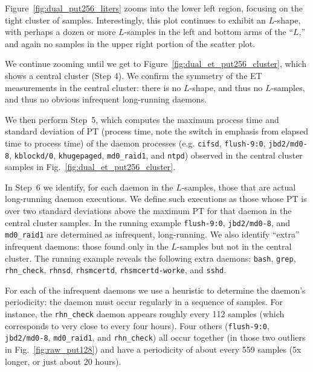\documentclass[letter]{ieice}
\begin{document}
Figure~\ref{fig:dual_put256_liters} zooms into the lower left region,
focusing on the
tight cluster of samples.  Interestingly, this plot continues to exhibit an
$L$-shape, with perhaps a dozen or more $L$-samples in the left and bottom arms of
the ``$L$,'' and again no samples in the upper right portion of the
scatter plot.

We continue zooming until we get to Figure~\ref{fig:dual_et_put256_cluster},
which shows a central cluster (Step 4). 
We confirm the symmetry of the ET measurements in the central cluster: there
is no $L$-shape, and thus no $L$-samples, and thus no obvious infrequent
long-running daemons.

We then perform Step~5, which computes 
the maximum process time and standard deviation 
of PT (process time, note the switch in emphasis from elapsed time 
to process time) of the daemon processes 
(e.g. {\tt cifsd}, {\tt flush-9:0}, {\tt jbd2/md0-8}, 
{\tt kblockd/0}, {\tt khugepaged}, {\tt md0\_raid1}, and {\tt ntpd})
observed in the central cluster samples in Fig.~\ref{fig:dual_et_put256_cluster}. 

In Step~6 we identify, for each daemon in the \hbox{$L$-samples}, 
those that are actual long-running daemon
executions.  We define such executions as those whose PT 
is over two standard deviations above the maximum PT for
that daemon in the central cluster samples. 
In the running example  {\tt flush-9:0}, 
{\tt jbd2/md0-8}, and {\tt md0\_raid1} 
are determined as infrequent, long-running.
We also identify ``extra'' infrequent daemons: those
found only in the $L$-samples but not in the central cluster. 
The running example reveals the following extra daemons: 
{\tt bash}, {\tt grep}, {\tt rhn\_check}, {\tt rhnsd}, {\tt rhsmcertd}, 
{\tt rhsmcertd-worke}, and {\tt sshd}.

For each of the infrequent daemons 
we use a heuristic to determine the daemon's periodicity: 
the daemon must occur regularly in a sequence of samples.
For instance, the {\tt rhn\_check} daemon appears 
roughly every 112 samples (which corresponds to very close to every four 
hours). Four others ({\tt flush-9:0}, {\tt jbd2/md0-8}, 
{\tt md0\_raid1}, and {\tt rhn\_check}) all occur together 
(in those two outliers in Fig.~\ref{fig:raw_put128}) and 
  have a periodicity of about every 559 samples
  (5x longer, or just about 20 hours). 
\end{document}
